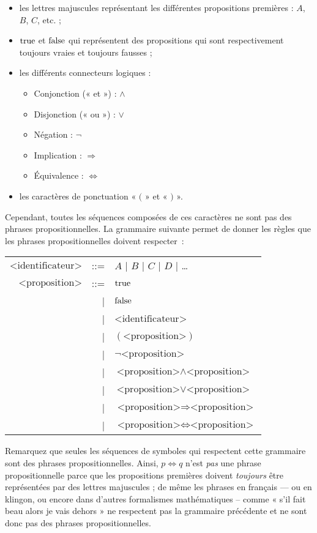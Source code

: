 \begin{itemize}
\item les lettres majuscules représentant les différentes propositions
  premières : $A$, $B$, $C$, etc. ;
\item $\mathrm{true}$ et $\mathrm{false}$ qui représentent des propositions qui sont
  respectivement toujours vraies et toujours fausses ;
\item les différents connecteurs logiques :
	\begin{itemize}
	\item Conjonction (« et ») : $\land$
	\item Disjonction (« ou ») : $\lor$
	\item Négation :  $\lnot$
	\item Implication :  $\Rightarrow$
	\item Équivalence :  $\Leftrightarrow$
	\end{itemize}
\item les caractères de ponctuation « $($ » et « $)$ ».
\end{itemize}

Cependant, toutes les séquences composées de ces caractères ne sont pas des
phrases propositionnelles. La grammaire suivante permet de donner les règles que
les phrases propositionnelles doivent respecter~:

\begin{tabular}{rrl}
  $\textrm{<identificateur>}$ & ::= & $A$ | $B$ | $C$ | $D$ | \dots \\
  $\textrm{<proposition>}$
  & ::= & $\mathrm{true}$ \\
  & | & $\mathrm{false}$ \\
  & | & $\textrm{<identificateur>}$ \\
  & | & $(\textrm{<proposition>})$ \\
  & | & $\lnot \textrm{<proposition>}$ \\
  & | & $\textrm{<proposition>} \land \textrm{<proposition>}$ \\
  & | & $\textrm{<proposition>} \lor \textrm{<proposition>}$ \\
  & | & $\textrm{<proposition>} \Rightarrow \textrm{<proposition>}$ \\
  & | & $\textrm{<proposition>} \Leftrightarrow \textrm{<proposition>}$
\end{tabular}
\vspace{2 mm}

Remarquez que seules les séquences de symboles qui respectent cette
grammaire sont des phrases propositionnelles. Ainsi, $p \Leftrightarrow q$
n’est \textit{pas} une phrase propositionnelle parce que les propositions
premières doivent \textit{toujours} être
représentées par des lettres majuscules ; de même les phrases en français —
ou en klingon, ou encore dans d’autres formalismes mathématiques – comme «
  s’il fait beau alors je vais dehors » ne respectent pas la grammaire
précédente et ne sont donc pas des phrases propositionnelles.

